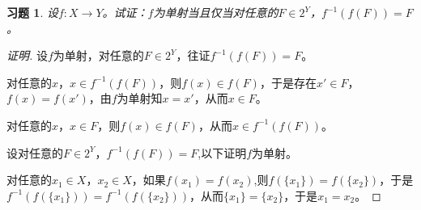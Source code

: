 \documentclass{article}
\begin{document}
\begin{CJK}{UTF8}{gbsn}
\newtheorem*{Ex}{习题}
\begin{Ex}
设$f:X\to Y$。试证：$f$为单射当且仅当对任意的$F\in 2^Y$，$f^{-1}(f(F))=F$。
\end{Ex}
\begin{proof}[证明]
  设$f$为单射，对任意的$F\in 2^Y$，往证$f^{-1}(f(F))=F$。

  对任意的$x$，$x\in f^{-1}(f(F))$，则$f(x)\in f(F)$，于是存在$x'\in F$，$f(x)=f(x')$，由$f$为单射知$x=x'$，从而$x\in F$。

  对任意的$x$，$x\in F$，则$f(x)\in f(F)$，从而$x\in f^{-1}(f(F))$。

  设对任意的$F\in 2^Y$，$f^{-1}(f(F))=F$,以下证明$f$为单射。

  对任意的$x_1\in X$，$x_2\in X$，如果$f(x_1)=f(x_2)$,则$f(\{x_1\})=f(\{x_2\})$，于是$f^{-1}(f(\{x_1\}))=f^{-1}(f(\{x_2\}))$，从而$\{x_1\}=\{x_2\}$，于是$x_1=x_2$。
  
\end{proof}
\end{CJK}
\end{document}

